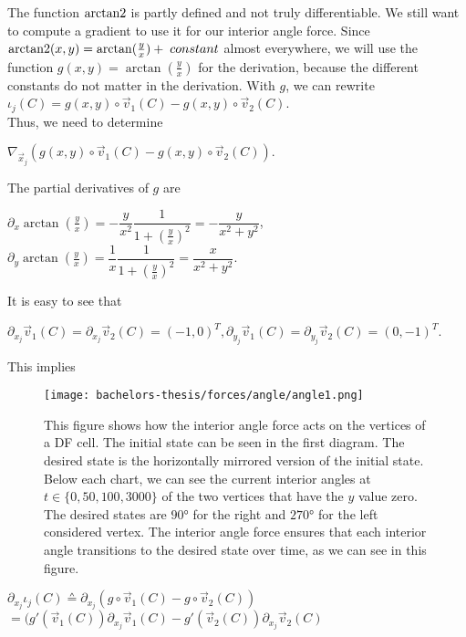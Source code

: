\begin{proposition}
	The function $\operatorname{arctan2}$ is partly defined and not truly differentiable. We still want to compute a gradient to use it for our interior angle force. Since $\operatorname{arctan2}(x,y) = \arctan(\frac{y}{x}) + \; constant$ almost everywhere, we will use the function $g(x,y) = \arctan(\frac{y}{x})$ for the derivation, because the different constants do not matter in the derivation. With $g$, we can rewrite $\iota_j(C) =g(x,y) \circ \vec{v}_1(C) - g(x,y) \circ \vec{v}_2(C) $. \\
	Thus, we need to determine 
	\begin{center}
		$
		\nabla_{\vec{x}_j} (g(x,y) \circ \vec{v}_1(C) - g(x,y) \circ \vec{v}_2(C)).
		$
	\end{center}
	The partial derivatives of $g$ are
	\begin{center}
		$\partial_{x} \arctan(\frac{y}{x}) = - \dfrac{y}{x^2} \dfrac{1}{1 + (\frac{y}{x})^2} = - \dfrac{y}{x^2 + y^2}$, \\
		$\partial_{y} \arctan(\frac{y}{x}) =  \dfrac{1}{x} \dfrac{1}{1 + (\frac{y}{x})^2} =  \dfrac{x}{x^2 + y^2}$.
	\end{center}
	It is easy to see that 
	\begin{center}
		$
		\partial_{x_j} \vec{v}_1(C) = \partial_{x_j} \vec{v}_2(C) = (-1,0)^T,
		\partial_{y_j} \vec{v}_1(C) = \partial_{y_j} \vec{v}_2(C) = (0, -1)^T. 
		$
	\end{center}
	This implies
	\begin{figure}[b!]
		\begin{center}
			\texttt{[image: bachelors-thesis/forces/angle/angle1.png]}
			\caption{This figure shows how the interior angle force acts on the vertices of a DF cell. The initial state can be seen in the first diagram. The desired state is the horizontally mirrored version of the initial state. Below each chart, we can see the current interior angles at $t \in \{0,50,100,3000\}$ of the two vertices that have the $y$ value zero. The desired states are $90$° for the right and $270$° for the left considered vertex. The interior angle force ensures that each interior angle transitions to the desired state over time, as we can see in this figure. }
			\label{fig:angleForce}
		\end{center}
	\end{figure}
	\begin{center}
		$
		\partial_{x_j} \iota_j(C) 
		\corresponds \partial_{x_j}( g\circ \vec{v}_1(C) - g \circ \vec{v}_2(C))$ \\ \smallbreak	
		$= (g'(\vec{v}_1(C)) \partial_{x_j} \vec{v}_1(C) - g'(\vec{v}_2(C))\partial_{x_j} \vec{v}_2(C) $ \\ \smallbreak	

\end{center}
\end{proposition}

